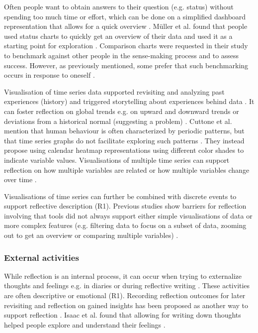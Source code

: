 Often people want to obtain answers to their question (e.g. status) without spending too much time or effort, which can be done on a simplified dashboard representation that allows for a quick overview \cite{Cuttone}. Müller et al. found that people used status charts to quickly get an overview of their data and used it as a starting point for exploration \cite{Muller}. Comparison charts were requested in their study to benchmark against other people in the sense-making process and to assess success. However, as previously mentioned, some prefer that such benchmarking occurs in response to oneself \cite{Ancker2015}. 

Visualisation of time series data supported revisiting and analyzing past experiences (history) and triggered storytelling about experiences behind data \cite{Rivera, Muller}. It can foster reflection on global trends e.g. on upward and downward trends or deviations from a historical normal (suggesting a problem) \cite{Rivera}. Cuttone et al. mention that human behaviour is often characterized by periodic patterns, but that time series graphs do not facilitate exploring such patterns \cite{Cuttone}. They instead propose using calendar heatmap representations using different color shades to indicate variable values. Visualisations of multiple time series can support reflection on how multiple variables are related or how multiple variables change over time \cite{Cuttone}. 

Visualisations of time series can further be combined with discrete events \cite{Sorensen} to support reflective description (R1). Previous studies show barriers for reflection involving that tools did not always support either simple visualisations of data or more complex features (e.g. filtering data to focus on a subset of data, zooming out to get an overview or comparing multiple variables) \cite{Li2011, MacLeod2014}. 

\subsubsection{External activities}
While reflection is an internal process, it can occur when trying to externalize thoughts and feelings e.g. in diaries or during reflective writing \cite{Mols}. These activities are often descriptive or emotional (R1). Recording reflection outcomes for later revisiting and reflection on gained insights has been proposed as another way to support reflection \cite{Isaac, Muller}. Isaac et al. found that allowing for writing down thoughts helped people explore and understand their feelings \cite{Isaac}. 

